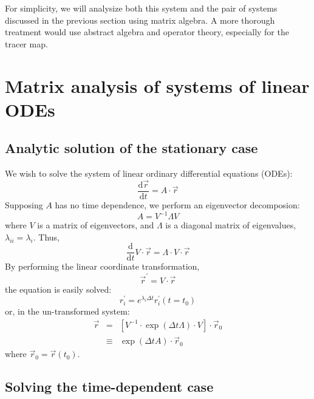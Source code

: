 \documentclass[12pt]{article}
\begin{document}
For simplicity, we will analysize both this system and the pair of systems
discussed in the previous section using matrix algebra.  A more thorough
treatment would use abstract algebra and operator theory, especially for
the tracer map.

\section{Matrix analysis of systems of linear ODEs} 

\subsection{Analytic solution of the stationary case}

We wish to solve the system of linear ordinary differential equations (ODEs):
\begin{equation}
\frac{\mathrm d \vec r}{\mathrm d t}=A \cdot \vec r
\label{linear_ODE_system_vector_soln}
\end{equation}
Supposing $A$ has no time dependence, we perform an eigenvector 
decomposion:
\begin{equation}
A = V^{-1} \Lambda V
\end{equation}
where $V$ is a matrix of eigenvectors, and $\Lambda$ is a diagonal matrix
of eigenvalues, $\lambda_{ii}=\lambda_i$.  Thus,
\begin{equation}
\frac{\mathrm d}{\mathrm d t} V \cdot \vec r=\Lambda \cdot V \cdot  \vec r
\end{equation}
By performing the linear coordinate transformation,
\begin{equation}
\vec r^\prime=V \cdot \vec r
\end{equation}
the equation is easily solved:
\begin{equation}
r^\prime_i = e^{\lambda_i \Delta t} r^\prime_i(t=t_0)
\end{equation}
or, in the un-transformed system:
\begin{eqnarray}
\vec r & = & \left [V^{-1} \cdot \exp(\Delta t \Lambda) \cdot V \right ] \cdot \vec r_0 
\label{solution_no_time_dependence} \\
& \equiv & \exp(\Delta t A)\cdot \vec r_0
\end{eqnarray}
where $\vec r_0=\vec r(t_0)$.

\subsection{Solving the time-dependent case}
\end{document}
